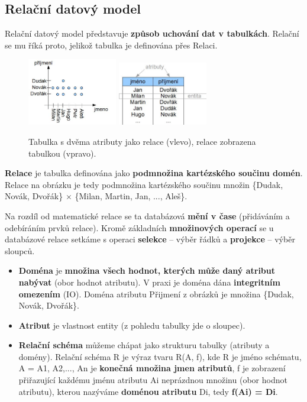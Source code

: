 \subsection{Relační datový model}
Relační datový model představuje \textbf{způsob uchování dat v tabulkách}. Relační se mu říká proto, jelikož tabulka je definována přes Relaci.

\begin{figure}[H]
	\centering
	\includegraphics[width=0.35\textwidth]{assets/tab_relace.png}
	\includegraphics[width=0.35\textwidth]{assets/relace.png}
	\caption{Tabulka s dvěma atributy jako relace (vlevo), relace zobrazena tabulkou (vpravo).}
\end{figure}

\textbf{Relace} je tabulka definována jako \textbf{podmnožina kartézského součinu domén}. Relace na obrázku je tedy podmnožina kartézského součinu množin \{Dudak, Novák, Dvořák\} $\times$ \{Milan, Martin, Jan, ..., Aleš\}.

Na rozdíl od matematické relace se ta databázová \textbf{mění v čase} (přidáváním a odebíráním prvků relace). Kromě základních \textbf{množinových operací} se u databázové relace setkáme s operaci \textbf{selekce} -- výběr řádků a \textbf{projekce} -- výběr sloupců.

\begin{itemize}
\item \textbf{Doména} je \textbf{množina všech hodnot, kterých může daný atribut nabývat} (obor hodnot atributu). V praxi je doména dána\textbf{ integritním omezením} (IO). Doména atributu Přijmení z obrázků je množina \{Dudak, Novák, Dvořák\}.
\item \textbf{Atribut} je vlastnost entity (z pohledu tabulky jde o sloupec).
\item \textbf{Relační schéma} můžeme chápat jako strukturu tabulky (atributy a domény).
Relační schéma R je výraz tvaru R(A, f),  kde  R  je jméno schématu, A = {A1, A2,..., An} je \textbf{konečná množina jmen atributů}, f je zobrazení přiřazující každému jménu atributu Ai neprázdnou množinu (obor hodnot atributu), kterou nazýváme \textbf{doménou atributu} Di, tedy \textbf{f(Ai) = Di}.
\end{itemize}

